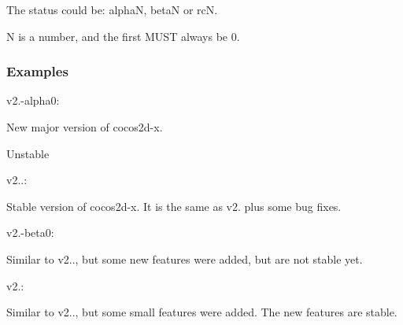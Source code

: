 The status could be\+: alphaN, betaN or rcN.

\textquotesingle{}N\textquotesingle{} is a number, and the first M\+U\+ST always be 0.

\subsubsection*{Examples}

v2.-\/alpha0\+:
\begin{DoxyItemize}
\item New major version of cocos2d-\/x.
\item Unstable
\end{DoxyItemize}

v2..\+:
\begin{DoxyItemize}
\item Stable version of cocos2d-\/x. It is the same as v2. plus some bug fixes.
\end{DoxyItemize}

v2.-\/beta0\+:
\begin{DoxyItemize}
\item Similar to v2.., but some new features were added, but are not stable yet.
\end{DoxyItemize}

v2.\+:
\begin{DoxyItemize}
\item Similar to v2.., but some small features were added. The new features are stable. 
\end{DoxyItemize}